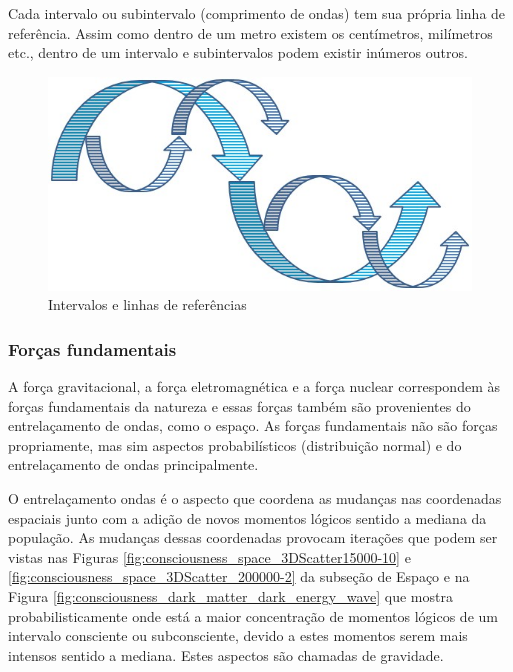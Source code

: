 Cada intervalo ou subintervalo (comprimento de ondas) tem sua própria linha de referência. Assim como dentro de um metro existem os centímetros, milímetros etc., dentro de um intervalo e subintervalos podem existir inúmeros outros.
	\begin{figure}[H]
	\caption{Intervalos e linhas de referências}
	\label{fig:consciousness_space_spiral_underlines}
	\centering
	\includegraphics[scale=.5]{sections/images/consciousness_space_spiral_underlines.jpg}
	\end{figure}

\subsubsection{Forças fundamentais}
A força gravitacional, a força eletromagnética e a força nuclear correspondem às forças fundamentais da natureza e essas forças também são provenientes do entrelaçamento de ondas, como o espaço. As forças fundamentais não são forças propriamente, mas sim aspectos probabilísticos (distribuição normal) e do entrelaçamento de ondas principalmente.

O entrelaçamento ondas é o aspecto que coordena as mudanças nas coordenadas espaciais junto com a adição de novos momentos lógicos sentido a mediana da população. As mudanças dessas coordenadas provocam iterações que podem ser vistas nas Figuras \ref{fig:consciousness_space_3DScatter15000-10} e \ref{fig:consciousness_space_3DScatter_200000-2} da subseção de Espaço e na Figura \ref{fig:consciousness_dark_matter_dark_energy_wave} que mostra probabilisticamente onde está a maior concentração de momentos lógicos de um intervalo consciente ou subconsciente, devido a estes momentos serem mais intensos sentido a mediana. Estes aspectos são chamadas de gravidade.


